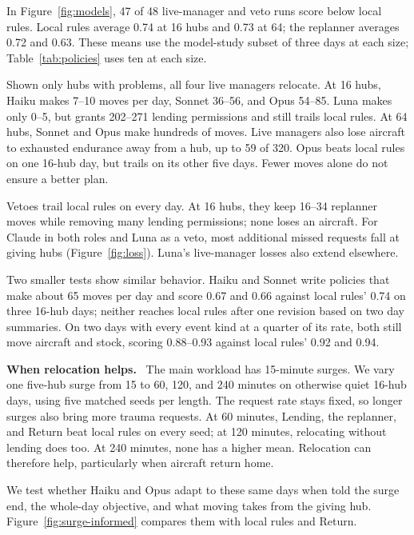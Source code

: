 \documentclass[letterpaper,10pt,conference]{ieeeconf}
\renewcommand{\paragraph}[1]{\par\textbf{#1.}\ }
\begin{document}
In Figure~\ref{fig:models}, 47 of 48 live-manager and veto runs score
below local rules. Local rules average 0.74 at 16 hubs and 0.73 at 64;
the replanner averages 0.72 and 0.63. These means use the model-study
subset of three days at each size; Table~\ref{tab:policies}
uses ten at each size.

Shown only hubs with problems, all four live managers relocate. At 16 hubs,
Haiku makes 7--10 moves per day, Sonnet 36--56, and Opus 54--85. Luna
makes only 0--5, but grants 202--271 lending permissions and still trails
local rules. At 64 hubs, Sonnet and Opus make hundreds of moves. Live
managers also lose aircraft to exhausted endurance away from a hub, up to
59 of 320. Opus beats local rules on one 16-hub day, but trails on its
other five days. Fewer moves alone do not ensure a better plan.

Vetoes trail local rules on every day. At 16 hubs, they keep 16--34
replanner moves while removing many lending permissions; none loses an
aircraft. For Claude in both roles and Luna as a veto, most additional
missed requests fall at giving hubs (Figure~\ref{fig:loss}). Luna's
live-manager losses also extend elsewhere.

Two smaller tests show similar behavior. Haiku and Sonnet write policies
that make about 65 moves per day and score 0.67 and 0.66 against local
rules' 0.74 on three 16-hub days; neither reaches local rules after one
revision based on two day summaries. On two days with every event kind
at a quarter of its rate, both still move aircraft and stock, scoring
0.88--0.93 against local rules' 0.92 and 0.94.

\paragraph{When relocation helps}
The main workload has 15-minute surges. We vary one five-hub surge from
15 to 60, 120, and 240 minutes on otherwise quiet 16-hub days, using five
matched seeds per length. The request rate stays fixed, so longer surges
also bring more trauma requests. At 60 minutes, Lending, the replanner,
and Return beat local rules on every seed; at 120 minutes, relocating
without lending does too. At 240 minutes, none has a higher mean.
Relocation can therefore help, particularly when aircraft return home.

We test whether Haiku and Opus adapt to these same days when told the surge
end, the whole-day objective, and what moving takes from the giving hub.
Figure~\ref{fig:surge-informed} compares them with local rules and Return.
\end{document}
